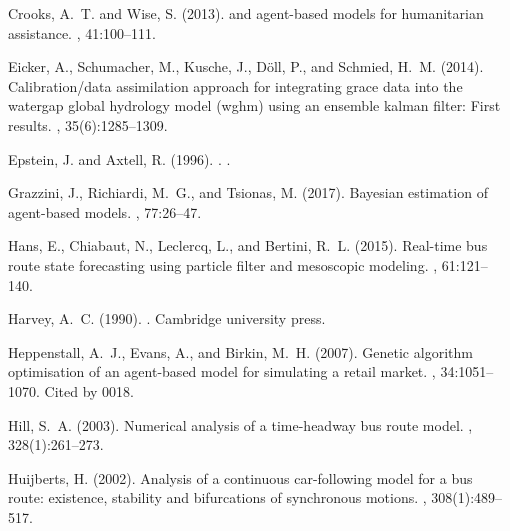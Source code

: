 \documentclass[11pt]{article}
\begin{document}
\begin{thebibliography}{}
Crooks, A.~T. and Wise, S. (2013).
 and agent-based models for humanitarian assistance.
, 41:100--111.

Eicker, A., Schumacher, M., Kusche, J., D{\"o}ll, P., and Schmied, H.~M.
  (2014).
\newblock Calibration/data assimilation approach for integrating grace data
  into the watergap global hydrology model (wghm) using an ensemble kalman
  filter: First results.
, 35(6):1285--1309.

Epstein, J. and Axtell, R. (1996).
.
.

Grazzini, J., Richiardi, M.~G., and Tsionas, M. (2017).
\newblock Bayesian estimation of agent-based models.
, 77:26--47.

Hans, E., Chiabaut, N., Leclercq, L., and Bertini, R.~L. (2015).
\newblock Real-time bus route state forecasting using particle filter and
  mesoscopic modeling.
,
  61:121--140.

Harvey, A.~C. (1990).
.
\newblock Cambridge university press.

Heppenstall, A.~J., Evans, A., and Birkin, M.~H. (2007).
\newblock Genetic algorithm optimisation of an agent-based model for simulating
  a retail market.
, 34:1051--1070.
\newblock Cited by 0018.

Hill, S.~A. (2003).
\newblock Numerical analysis of a time-headway bus route model.
,
  328(1):261--273.

Huijberts, H. (2002).
\newblock Analysis of a continuous car-following model for a bus route:
  existence, stability and bifurcations of synchronous motions.
,
  308(1):489--517.


\end{thebibliography}
\end{document}
